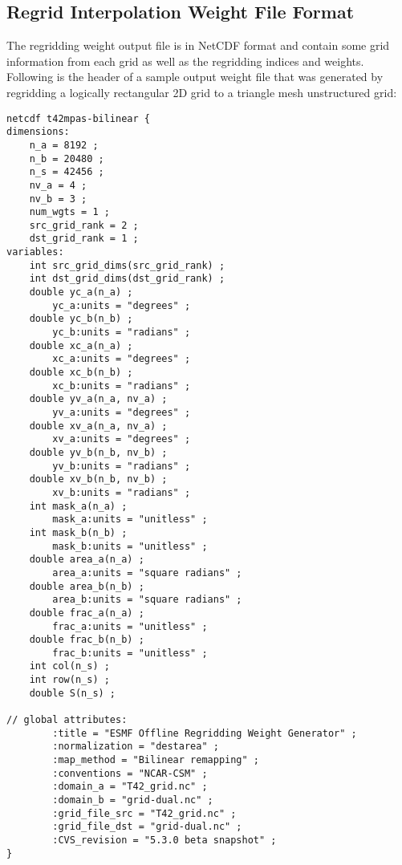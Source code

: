 \subsection{Regrid Interpolation Weight File Format}\label{sec:weightfileformat}

The regridding weight output file is in NetCDF format and contain some grid
information from each grid as well as the regridding indices and weights.
Following is the header of a sample output weight file that was generated by
regridding a logically rectangular 2D grid to a triangle mesh unstructured grid:

\begin{verbatim}
netcdf t42mpas-bilinear {
dimensions:
	n_a = 8192 ;
	n_b = 20480 ;
	n_s = 42456 ;
	nv_a = 4 ;
	nv_b = 3 ;
	num_wgts = 1 ;
	src_grid_rank = 2 ;
	dst_grid_rank = 1 ;
variables:
	int src_grid_dims(src_grid_rank) ;
	int dst_grid_dims(dst_grid_rank) ;
	double yc_a(n_a) ;
		yc_a:units = "degrees" ;
	double yc_b(n_b) ;
		yc_b:units = "radians" ;
	double xc_a(n_a) ;
		xc_a:units = "degrees" ;
	double xc_b(n_b) ;
		xc_b:units = "radians" ;
	double yv_a(n_a, nv_a) ;
		yv_a:units = "degrees" ;
	double xv_a(n_a, nv_a) ;
		xv_a:units = "degrees" ;
	double yv_b(n_b, nv_b) ;
		yv_b:units = "radians" ;
	double xv_b(n_b, nv_b) ;
		xv_b:units = "radians" ;
	int mask_a(n_a) ;
		mask_a:units = "unitless" ;
	int mask_b(n_b) ;
		mask_b:units = "unitless" ;
	double area_a(n_a) ;
		area_a:units = "square radians" ;
	double area_b(n_b) ;
		area_b:units = "square radians" ;
	double frac_a(n_a) ;
		frac_a:units = "unitless" ;
	double frac_b(n_b) ;
		frac_b:units = "unitless" ;
	int col(n_s) ;
	int row(n_s) ;
	double S(n_s) ;

// global attributes:
		:title = "ESMF Offline Regridding Weight Generator" ;
		:normalization = "destarea" ;
		:map_method = "Bilinear remapping" ;
		:conventions = "NCAR-CSM" ;
		:domain_a = "T42_grid.nc" ;
		:domain_b = "grid-dual.nc" ;
		:grid_file_src = "T42_grid.nc" ;
		:grid_file_dst = "grid-dual.nc" ;
		:CVS_revision = "5.3.0 beta snapshot" ;
}
\end{verbatim}

